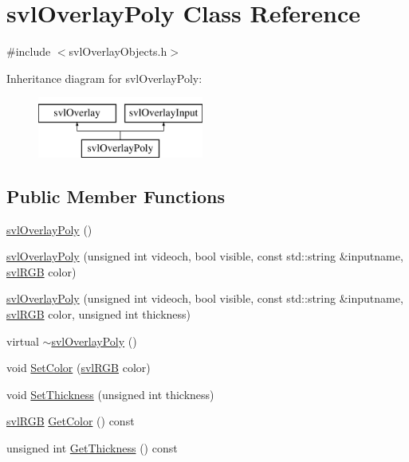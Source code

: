 \hypertarget{classsvl_overlay_poly}{}\section{svl\+Overlay\+Poly Class Reference}
\label{classsvl_overlay_poly}


{\ttfamily \#include $<$svl\+Overlay\+Objects.\+h$>$}

Inheritance diagram for svl\+Overlay\+Poly\+:\begin{figure}[H]
\begin{center}
\leavevmode
\includegraphics[height=2.000000cm]{db/d55/classsvl_overlay_poly}
\end{center}
\end{figure}
\subsection*{Public Member Functions}
\begin{DoxyCompactItemize}
\item 
\hyperlink{classsvl_overlay_poly_ab4b107e442172973c6fdc1f7c36fca57}{svl\+Overlay\+Poly} ()
\item 
\hyperlink{classsvl_overlay_poly_abf76edb915d18bae12dde0d6ff47561d}{svl\+Overlay\+Poly} (unsigned int videoch, bool visible, const std\+::string \&inputname, \hyperlink{structsvl_r_g_b}{svl\+R\+G\+B} color)
\item 
\hyperlink{classsvl_overlay_poly_ab4fbd3c2a843e2533a2d98dd45116dc7}{svl\+Overlay\+Poly} (unsigned int videoch, bool visible, const std\+::string \&inputname, \hyperlink{structsvl_r_g_b}{svl\+R\+G\+B} color, unsigned int thickness)
\item 
virtual \hyperlink{classsvl_overlay_poly_a1304caed814d4d26e4a8aa4acc8d47c3}{$\sim$svl\+Overlay\+Poly} ()
\item 
void \hyperlink{classsvl_overlay_poly_a0f277c2e37e0aabe403f687a02fce508}{Set\+Color} (\hyperlink{structsvl_r_g_b}{svl\+R\+G\+B} color)
\item 
void \hyperlink{classsvl_overlay_poly_a7082b7800f95a2226a338c99d43907f1}{Set\+Thickness} (unsigned int thickness)
\item 
\hyperlink{structsvl_r_g_b}{svl\+R\+G\+B} \hyperlink{classsvl_overlay_poly_ad8ddec61a3a6ff847cbc5b21f03b03da}{Get\+Color} () const 
\item 
unsigned int \hyperlink{classsvl_overlay_poly_a920f067bb1fba37c08d850b71bd2006c}{Get\+Thickness} () const 
\end{DoxyCompactItemize}
